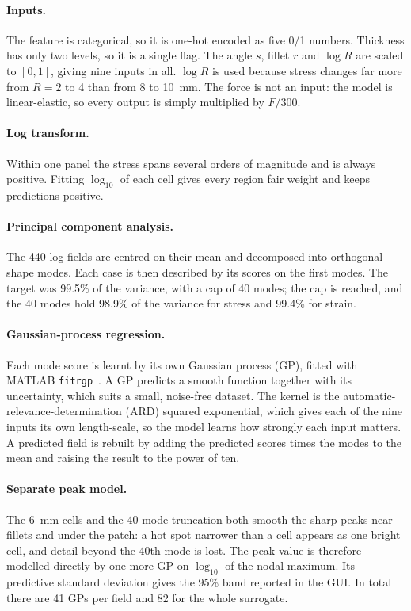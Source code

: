 \documentclass[11pt,a4paper]{article}
\begin{document}
\paragraph{Inputs.} The feature is categorical, so it is one-hot encoded as five 0/1 numbers. Thickness has only two levels, so it is a single flag. The angle $s$, fillet $r$ and $\log R$ are scaled to $[0, 1]$, giving nine inputs in all. $\log R$ is used because stress changes far more from $R = 2$ to 4 than from 8 to \SI{10}{mm}. The force is not an input: the model is linear-elastic, so every output is simply multiplied by $F/300$.

\paragraph{Log transform.} Within one panel the stress spans several orders of magnitude and is always positive. Fitting $\log_{10}$ of each cell gives every region fair weight and keeps predictions positive.

\paragraph{Principal component analysis.} The 440 log-fields are centred on their mean and decomposed into orthogonal shape modes. Each case is then described by its scores on the first modes. The target was 99.5\% of the variance, with a cap of 40 modes; the cap is reached, and the 40 modes hold 98.9\% of the variance for stress and 99.4\% for strain.

\paragraph{Gaussian-process regression.} Each mode score is learnt by its own Gaussian process (GP), fitted with MATLAB \texttt{fitrgp}~\cite{fitrgp}. A GP predicts a smooth function together with its uncertainty, which suits a small, noise-free dataset. The kernel is the automatic-relevance-determination (ARD) squared exponential, which gives each of the nine inputs its own length-scale, so the model learns how strongly each input matters. A predicted field is rebuilt by adding the predicted scores times the modes to the mean and raising the result to the power of ten.

\paragraph{Separate peak model.} The \SI{6}{mm} cells and the 40-mode truncation both smooth the sharp peaks near fillets and under the patch: a hot spot narrower than a cell appears as one bright cell, and detail beyond the 40th mode is lost. The peak value is therefore modelled directly by one more GP on $\log_{10}$ of the nodal maximum. Its predictive standard deviation gives the 95\% band reported in the GUI. In total there are 41 GPs per field and 82 for the whole surrogate.
\end{document}
